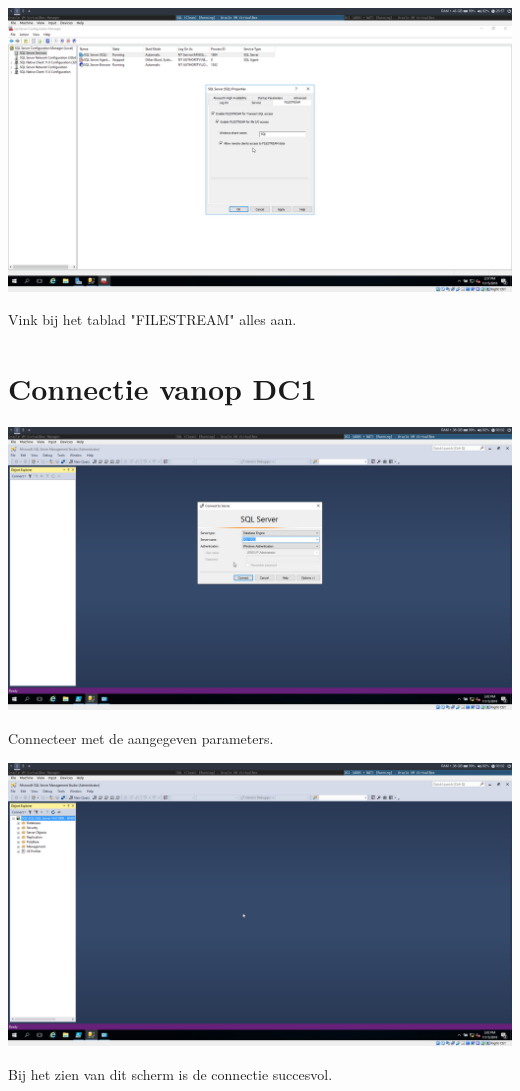 \documentclass[a4paper]{article}
\begin{document}
\begin{center}
	\includegraphics[width=15cm]{Pictures/SQL/1542322673.png}
	
	Vink bij het tablad "FILESTREAM" alles aan.
\end{center}

\clearpage

\section{Connectie vanop DC1}
\begin{center}
	\includegraphics[width=15cm]{Pictures/SQL/1542322958.png}
	
	Connecteer met de aangegeven parameters.
\end{center}
\begin{center}
	\includegraphics[width=15cm]{Pictures/SQL/1542322961.png}
	
	Bij het zien van dit scherm is de connectie succesvol.
\end{center}
\end{document}
